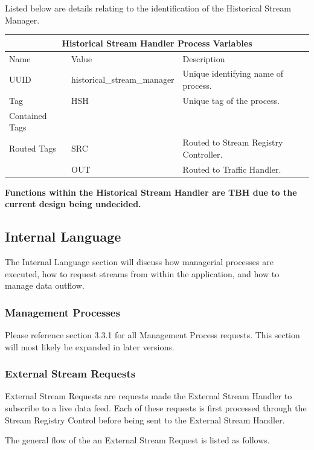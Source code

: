 \documentclass{article}
\begin{document}
Listed below are details relating to the identification of the Historical Stream Manager.

\begin{center}
\begin{tabular}{ | p{5cm} || p{4cm} | p{6cm} | }
\hline
\multicolumn{3}{|c|}{Historical Stream Handler Process Variables}\\
\hline
Name & Value & Description\\
\hline
UUID & historical\_stream\_manager & Unique identifying name of process.\\
\hline
Tag & HSH & Unique tag of the process.\\
\hline
Contained Tags & & \\
\hline
Routed Tags & SRC & Routed to Stream Registry Controller.\\
 & OUT & Routed to Traffic Handler.\\
\hline
\end{tabular}
\end{center}

\textbf{Functions within the Historical Stream Handler are TBH due to the current design being undecided.}

\cleardoublepage
\subsection{Internal Language}
The Internal Language section will discuss how managerial processes are executed, how to request streams from within the application, and how to manage data outflow.

\subsubsection{Management Processes}
Please reference section 3.3.1 for all Management Process requests. This section will most likely be expanded in later versions.

\subsubsection{External Stream Requests}
External Stream Requests are requests made the External Stream Handler to subscribe to a live data feed. Each of these requests is first processed through the Stream Registry Control before being sent to the External Stream Handler.

The general flow of the an External Stream Request is listed as follows.
\end{document}
